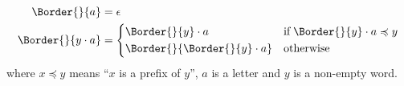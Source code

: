 \[
\begin{aligned}
  \Border{}{a}
 &= \epsilon\\
\Border{}{y \cdot a} &= \left\{
\begin{aligned}
& \Border{}{y} \cdot a 
&& \text{if} \; \Border{}{y} \cdot a \preccurlyeq y\\
& \Border{}{\Border{}{y} \cdot a} 
&& \text{otherwise}
\end{aligned}
\right.
\end{aligned}
\]
where \(x \preccurlyeq y\) means ``\(x\) is a prefix of \(y\)'', \(a\)
  is a letter and \(y\) is a non-empty word.
